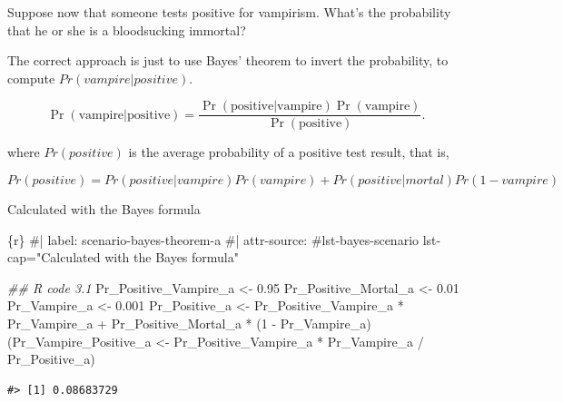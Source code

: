 \documentclass[
  letterpaper,
  DIV=11,
  numbers=noendperiod]{scrreprt}
\newenvironment{Shaded}{\begin{snugshade}}{\end{snugshade}}
\newcommand{\CommentTok}[1]{\textcolor[rgb]{0.37,0.37,0.37}{#1}}
\newcommand{\DecValTok}[1]{\textcolor[rgb]{0.68,0.00,0.00}{#1}}
\newcommand{\DocumentationTok}[1]{\textcolor[rgb]{0.37,0.37,0.37}{\textit{#1}}}
\newcommand{\FloatTok}[1]{\textcolor[rgb]{0.68,0.00,0.00}{#1}}
\newcommand{\InformationTok}[1]{\textcolor[rgb]{0.37,0.37,0.37}{#1}}
\newcommand{\NormalTok}[1]{\textcolor[rgb]{0.00,0.23,0.31}{#1}}
\newcommand{\OtherTok}[1]{\textcolor[rgb]{0.00,0.23,0.31}{#1}}
\newcommand{\SpecialCharTok}[1]{\textcolor[rgb]{0.37,0.37,0.37}{#1}}
\begin{document}
Suppose now that someone tests positive for vampirism. What's the
probability that he or she is a bloodsucking immortal?

The correct approach is just to use Bayes' theorem to invert the
probability, to compute \(Pr(vampire | positive)\).

\[
\Pr(\text{vampire}|\text{positive}) = \frac{\Pr(\text{positive}|\text{vampire})\Pr(\text{vampire})}{\Pr(\text{positive})}.
\]

where \(Pr(positive)\) is the average probability of a positive test
result, that is,

\[
Pr(positive) = Pr(positive|vampire)Pr(vampire) + Pr(positive|mortal)Pr(1-vampire)
\]

\begin{codelisting}

\caption{Calculated with the Bayes formula}

\hypertarget{lst-bayes-scenario}{%
\label{lst-bayes-scenario}}%
\begin{Shaded}
\begin{Highlighting}[]
\InformationTok{\textasciigrave{}\textasciigrave{}\textasciigrave{}\{r\}}
\CommentTok{\#| label: scenario{-}bayes{-}theorem{-}a}
\CommentTok{\#| attr{-}source: \textquotesingle{}\#lst{-}bayes{-}scenario lst{-}cap="Calculated with the Bayes formula"\textquotesingle{}}

\DocumentationTok{\#\# R code 3.1}
\NormalTok{Pr\_Positive\_Vampire\_a }\OtherTok{\textless{}{-}} \FloatTok{0.95}
\NormalTok{Pr\_Positive\_Mortal\_a }\OtherTok{\textless{}{-}} \FloatTok{0.01}
\NormalTok{Pr\_Vampire\_a }\OtherTok{\textless{}{-}} \FloatTok{0.001}
\NormalTok{Pr\_Positive\_a }\OtherTok{\textless{}{-}}\NormalTok{ Pr\_Positive\_Vampire\_a }\SpecialCharTok{*}\NormalTok{ Pr\_Vampire\_a }\SpecialCharTok{+}
\NormalTok{  Pr\_Positive\_Mortal\_a }\SpecialCharTok{*}\NormalTok{ (}\DecValTok{1} \SpecialCharTok{{-}}\NormalTok{ Pr\_Vampire\_a)}
\NormalTok{(Pr\_Vampire\_Positive\_a }\OtherTok{\textless{}{-}}\NormalTok{ Pr\_Positive\_Vampire\_a }\SpecialCharTok{*}\NormalTok{ Pr\_Vampire\_a }\SpecialCharTok{/}\NormalTok{ Pr\_Positive\_a)}
\InformationTok{\textasciigrave{}\textasciigrave{}\textasciigrave{}}
\end{Highlighting}
\end{Shaded}

\end{codelisting}

\begin{verbatim}
#> [1] 0.08683729
\end{verbatim}
\end{document}
